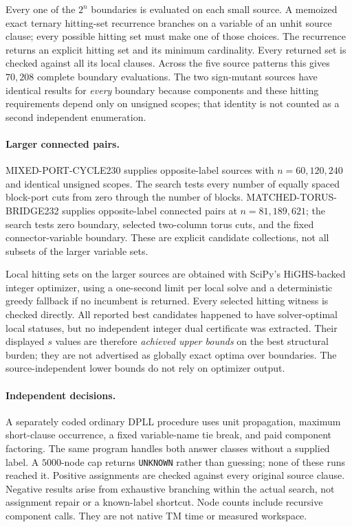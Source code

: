 \documentclass[11pt]{article}
\begin{document}
Every one of the $2^n$ boundaries is evaluated on each small source. A memoized exact ternary hitting-set recurrence branches on a variable of an unhit source clause; every possible hitting set must make one of those choices. The recurrence returns an explicit hitting set and its minimum cardinality. Every returned set is checked against all its local clauses. Across the five source patterns this gives $70{,}208$ complete boundary evaluations. The two sign-mutant sources have identical results for \emph{every} boundary because components and these hitting requirements depend only on unsigned scopes; that identity is not counted as a second independent enumeration.

\paragraph{Larger connected pairs.}
MIXED-PORT-CYCLE230 \cite{cycle230} supplies opposite-label sources with $n=60,120,240$ and identical unsigned scopes. The search tests every number of equally spaced block-port cuts from zero through the number of blocks. MATCHED-TORUS-BRIDGE232 \cite{torus232} supplies opposite-label connected pairs at $n=81,189,621$; the search tests zero boundary, selected two-column torus cuts, and the fixed connector-variable boundary. These are explicit candidate collections, not all subsets of the larger variable sets.

Local hitting sets on the larger sources are obtained with SciPy's HiGHS-backed integer optimizer, using a one-second limit per local solve and a deterministic greedy fallback if no incumbent is returned. Every selected hitting witness is checked directly. All reported best candidates happened to have solver-optimal local statuses, but no independent integer dual certificate was extracted. Their displayed $s$ values are therefore \emph{achieved upper bounds} on the best structural burden; they are not advertised as globally exact optima over boundaries. The source-independent lower bounds do not rely on optimizer output.

\paragraph{Independent decisions.}
A separately coded ordinary DPLL procedure uses unit propagation, maximum short-clause occurrence, a fixed variable-name tie break, and paid component factoring. The same program handles both answer classes without a supplied label. A $5000$-node cap returns \texttt{UNKNOWN} rather than guessing; none of these runs reached it. Positive assignments are checked against every original source clause. Negative results arise from exhaustive branching within the actual search, not assignment repair or a known-label shortcut. Node counts include recursive component calls. They are not native TM time or measured workspace.
\end{document}
